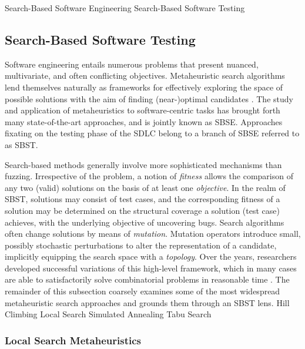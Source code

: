  {Search-Based Software Engineering}
 {Search-Based Software Testing}

\subsection{Search-Based Software Testing}

Software engineering entails numerous problems that present
nuanced, multivariate, and often conflicting objectives.
Metaheuristic search algorithms lend themselves naturally
as frameworks for effectively exploring the space of possible
solutions with the aim of finding (near-)optimal candidates \cite{harman2001search}.
The study and application of metaheuristics to software-centric tasks
has brought forth many state-of-the-art approaches, and is jointly known
as \Gls{SBSE}.
Approaches fixating on the testing phase of the \gls{SDLC}
belong to a branch of \gls{SBSE} referred to as \gls{SBST}.

Search-based methods generally involve more sophisticated
mechanisms than fuzzing.
Irrespective of the problem, a notion of \textit{fitness}
allows the comparison of any two (valid) solutions
on the basis of at least one \textit{objective}.
In the realm of \gls{SBST}, solutions may consist
of test cases, and the corresponding fitness
of a solution may be determined on the structural
coverage a solution (test case) achieves, with the 
underlying objective of uncovering bugs.
Search algorithms often change solutions by means of \textit{mutation}.
Mutation operators introduce small, possibly stochastic perturbations
to alter the representation of a candidate, implicitly
equipping the search space with a \textit{topology}.
Over the years, researchers developed successful variations
of this high-level framework, which in many cases are able
to satisfactorily solve combinatorial
problems in reasonable time \citep{mcminn2011search}.
The remainder of this subsection coarsely examines
some of the most widespread metaheuristic search approaches
and grounds them through an \gls{SBST} lens.
 {Hill Climbing}
 {Local Search}
 {Simulated Annealing}
 {Tabu Search}

\subsubsection{Local Search Metaheuristics}

